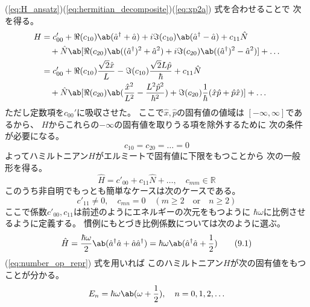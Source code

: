 (\ref{eq:H_ansatz})(\ref{eq:hermitian_decomposite})(\ref{eq:xp2a})
式を合わせることで
次を得る。
\begin{equation}
  \begin{split}
    H &= c'_{00} +
    \Re(c_{10})\ab(\hat{a}^\dagger+\hat{a})
    +i\Im(c_{10})\ab(\hat{a}^\dagger-\hat{a})
    +c_{11}\hat{N} \\
    &\quad+\hat{N}
    \ab[
      \Re(c_{20})\ab((\hat{a}^\dagger)^2+\hat{a}^2)
      +i\Im(c_{20})\ab((\hat{a}^\dagger)^2-\hat{a}^2)
    ]
    +\ldots \\
    &= c'_{00} +
    \Re(c_{10})\frac{\sqrt{2}\hat{x}}{L}
    -\Im(c_{10})\frac{\sqrt{2}L\hat{p}}{\hbar}
    +c_{11}\hat{N} \\
    &\quad+\hat{N}
    \ab[\Re(c_{20})
      \ab(
      \frac{\hat{x}^2}{L^2}-\frac{L^2\hat{p}^2}{\hbar^2}
      )
      +\Im(c_{20})
      \frac{1}{\hbar}(\hat{x}\hat{p}+\hat{p}\hat{x})
    ]
    +\ldots
  \end{split}
\end{equation}
ただし定数項を$c_{00}'$に吸収させた。
ここで$\hat{x},\hat{p}$の固有値の値域は
$[-\infty,\infty]$であるから、
$H$からこれらの$-\infty$の固有値を取りうる項を除外するために
次の条件が必要になる。
\begin{equation}
  c_{10}=c_{20}=\ldots=0
\end{equation}
よってハミルトニアン$H$がエルミートで固有値に下限をもつことから
次の一般形を得る。
\begin{equation}
  \hat{H}
  =c'_{00}+c_{11}\hat{N}+\ldots,\quad
  c_{mm}\in\mathbb{R}
\end{equation}
このうち非自明でもっとも簡単なケースは次のケースである。
\begin{equation}
  c'_{11}\neq0,\quad
  c_{mn} = 0\quad(m\geq2\quad\text{or}\quad n\geq2)
\end{equation}
ここで係数$c'_{00},c_{11}$は前述のようにエネルギーの次元をもつように
$\hbar\omega$に比例させるように定義する。
慣例にもとづき比例係数については次のように選ぶ。
\begin{equation}
  \label{eq:ladder_H}
  \hat{H}
  =\frac{\hbar\omega}{2}\ab(\hat{a}^\dagger\hat{a}+\hat{a}\hat{a}^\dagger)
  =\hbar\omega\ab(\hat{a}^\dagger\hat{a}+\frac{1}{2})
  \tag{9.1}
\end{equation}
(\ref{eq:number_op_repr}) 式を用いれば
このハミルトニアン$H$が次の固有値をもつことが分かる。
\begin{equation}
  E_n=\hbar\omega\ab(\omega+\frac{1}{2}),\quad
  n=0,1,2,\ldots
\end{equation}

